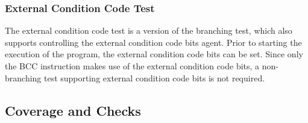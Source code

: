\subsubsection{External Condition Code Test}

The external condition code test is a version of the branching test, which also supports controlling the external condition code bits agent.
Prior to starting the execution of the program, the external condition code bits can be set. 
Since only the BCC instruction makes use of the external condition code bits, a non-branching test supporting external condition code bits is not required.

\subsection{Coverage and Checks}